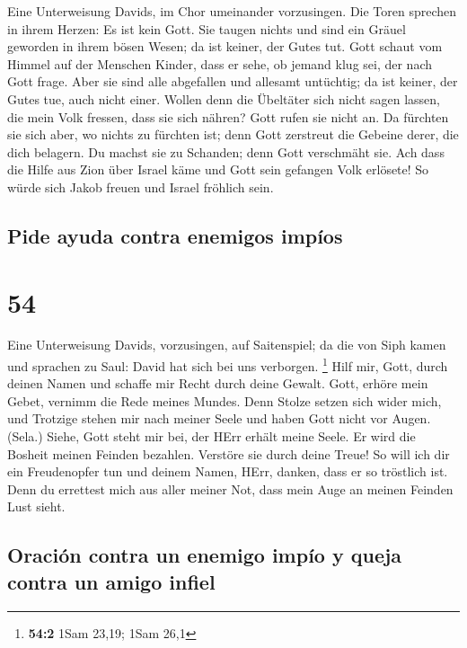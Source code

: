  Eine Unterweisung Davids, im Chor umeinander vorzusingen.
 Die Toren sprechen in ihrem Herzen: Es ist kein Gott. Sie
taugen nichts und sind ein Gräuel geworden in ihrem bösen Wesen; da ist
keiner, der Gutes tut.  Gott schaut vom Himmel auf der
Menschen Kinder, dass er sehe, ob jemand klug sei, der nach Gott frage.
 Aber sie sind alle abgefallen und allesamt untüchtig; da
ist keiner, der Gutes tue, auch nicht einer.  Wollen denn
die Übeltäter sich nicht sagen lassen, die mein Volk fressen, dass sie
sich nähren? Gott rufen sie nicht an.  Da fürchten sie
sich aber, wo nichts zu fürchten ist; denn Gott zerstreut die Gebeine
derer, die dich belagern. Du machst sie zu Schanden; denn Gott
verschmäht sie.  Ach dass die Hilfe aus Zion über Israel
käme und Gott sein gefangen Volk erlösete! So würde sich Jakob freuen
und Israel fröhlich sein.

\hypertarget{pide-ayuda-contra-enemigos-impuxedos}{%
\subsection{Pide ayuda contra enemigos
impíos}\label{pide-ayuda-contra-enemigos-impuxedos}}

\hypertarget{section-53}{%
\section{54}\label{section-53}}

 Eine Unterweisung Davids, vorzusingen, auf Saitenspiel;
 da die von Siph kamen und sprachen zu Saul: David hat
sich bei uns verborgen. \footnote{\textbf{54:2} 1Sam 23,19; 1Sam 26,1}
 Hilf mir, Gott, durch deinen Namen und schaffe mir Recht
durch deine Gewalt.  Gott, erhöre mein Gebet, vernimm die
Rede meines Mundes.  Denn Stolze setzen sich wider mich,
und Trotzige stehen mir nach meiner Seele und haben Gott nicht vor
Augen. (Sela.)  Siehe, Gott steht mir bei, der HErr erhält
meine Seele.  Er wird die Bosheit meinen Feinden bezahlen.
Verstöre sie durch deine Treue!  So will ich dir ein
Freudenopfer tun und deinem Namen, HErr, danken, dass er so tröstlich
ist.  Denn du errettest mich aus aller meiner Not, dass
mein Auge an meinen Feinden Lust sieht.

\hypertarget{oraciuxf3n-contra-un-enemigo-impuxedo-y-queja-contra-un-amigo-infiel}{%
\subsection{Oración contra un enemigo impío y queja contra un amigo
infiel}\label{oraciuxf3n-contra-un-enemigo-impuxedo-y-queja-contra-un-amigo-infiel}}

